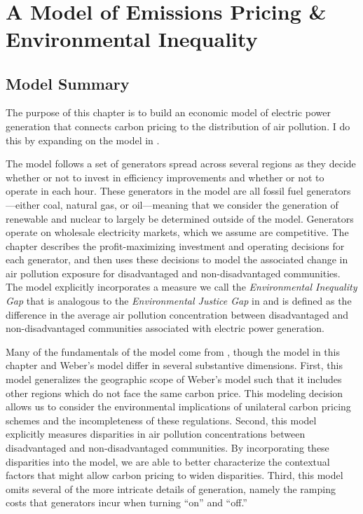 ~
\newpage
\section{A Model of Emissions Pricing \& Environmental Inequality}

\subsection{Model Summary}

The purpose of this chapter is to build an economic model of electric power generation that connects carbon pricing to the distribution of air pollution. I do this by expanding on the model in \cite{weber2021dynamic}. 

The model follows a set of generators spread across several regions as they decide whether or not to invest in efficiency improvements and whether or not to operate in each hour. These generators in the model are all fossil fuel generators---either coal, natural gas, or oil---meaning that we consider the generation of renewable and nuclear to largely be determined outside of the model. Generators operate on wholesale electricity markets, which we assume are competitive. The chapter describes the profit-maximizing investment and operating decisions for each generator, and then uses these decisions to model the associated change in air pollution exposure for disadvantaged and non-disadvantaged communities. The model explicitly incorporates a measure we call the \emph{Environmental Inequality Gap} that is analogous to the \emph{Environmental Justice Gap} in \cite{hernandez2023environmental} and is defined as the difference in the average air pollution concentration between disadvantaged and non-disadvantaged communities associated with electric power generation.  

Many of the fundamentals of the model come from \cite{weber2021dynamic}, though the model in this chapter and Weber's model differ in several substantive dimensions. First, this model generalizes the geographic scope of Weber's model such that it includes other regions which do not face the same carbon price. This modeling decision allows us to consider the environmental implications of unilateral carbon pricing schemes and the incompleteness of these regulations. Second, this model explicitly measures disparities in air pollution concentrations between disadvantaged and non-disadvantaged communities. By incorporating these disparities into the model, we are able to better characterize the contextual factors that might allow carbon pricing to widen disparities. Third, this model omits several of the more intricate details of generation, namely the ramping costs that generators incur when turning ``on'' and ``off.''

